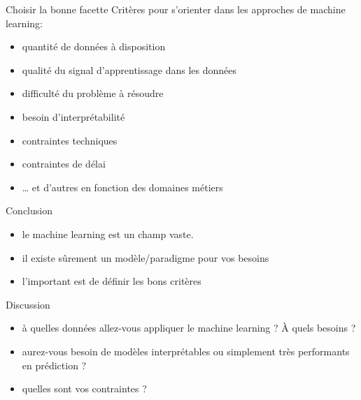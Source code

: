\begin{frame}{Choisir la bonne facette}
  Critères pour s'orienter dans les approches de machine learning:
  \begin{itemize}[<+->]
  \item quantité de données à disposition
  \item qualité du signal d'apprentissage dans les données
  \item difficulté du problème à résoudre
  \item besoin d'interprétabilité
  \item contraintes techniques
  \item contraintes de délai
  \item … et d'autres en fonction des domaines métiers
  \end{itemize}
\end{frame}

\begin{frame}{Conclusion}
  \begin{itemize}
  \item le machine learning est un champ vaste.
  \item il existe sûrement un modèle/paradigme pour vos besoins
  \item l'important est de définir les bons critères
  \end{itemize}
\end{frame}

\begin{frame}{Discussion}
  \begin{itemize}
  \item à quelles données allez-vous appliquer le machine learning ? À
    quels besoins ?
  \item aurez-vous besoin de modèles interprétables ou simplement très
    performants en prédiction ?
  \item quelles sont vos contraintes ?
  \end{itemize}
\end{frame}
